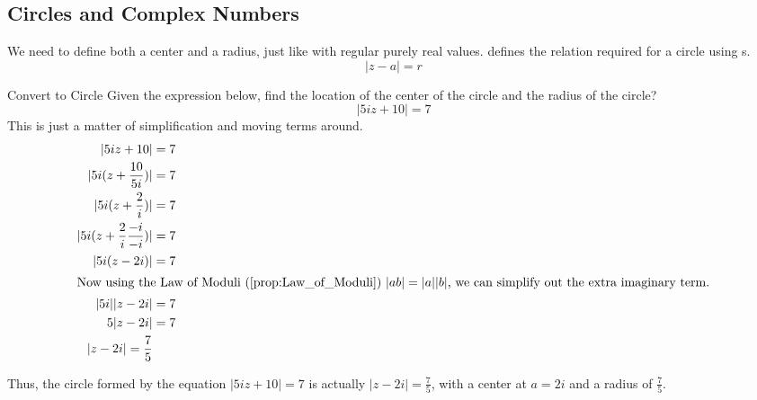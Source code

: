 \subsection{Circles and Complex Numbers}\label{subsec:Circles_Complex_Numbers}
We need to define both a center and a radius, just like with regular purely real values.
 defines the relation required for a circle using s.
\begin{equation}\label{eq:Circles_Complex_Numbers}
  \lvert z - a \rvert = r
\end{equation}

\begin{example}{Convert to Circle}
  Given the expression below, find the location of the center of the circle and the radius of the circle?
  \begin{equation*}
    \lvert 5 iz + 10 \rvert = 7
  \end{equation*}
  \tcblower{}
  This is just a matter of simplification and moving terms around.
  \begin{align*}
    \lvert 5 iz + 10 \rvert &= 7 \\
    \lvert 5i (z + \frac{10}{5i}) \rvert &= 7 \\
    \lvert 5i (z + \frac{2}{i}) \rvert &= 7 \\
    \lvert 5i (z + \frac{2}{i} \frac{-i}{-i}) \rvert &= 7 \\
    \lvert 5i (z - 2i) \rvert &= 7 \\
    \intertext{Now using the Law of Moduli (\Cref{prop:Law_of_Moduli}) $\lvert a b \rvert = \lvert a \rvert \lvert b \rvert$, we can simplify out the extra imaginary term.}
    \lvert 5i \rvert \lvert z-2i \rvert &= 7 \\
    5 \lvert z - 2i \rvert &= 7 \\
    \lvert z - 2i \rvert = \frac{7}{5}
  \end{align*}

  Thus, the circle formed by the equation $\lvert 5 iz + 10 \rvert = 7$ is actually $\lvert z - 2i \rvert = \frac{7}{5}$, with a center at $a = 2i$ and a radius of $\frac{7}{5}$.
\end{example}


